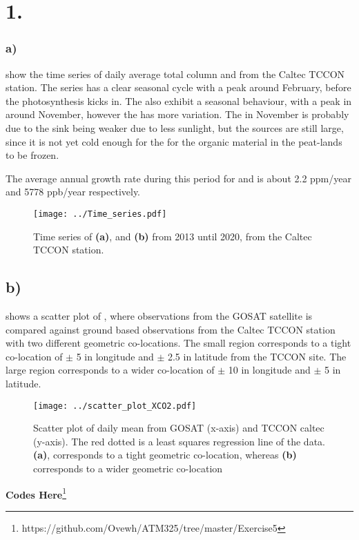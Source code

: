 \section*{1.}

\subsubsection*{a)}  show the time series of
daily average total column  and  from the Caltec TCCON station.
The  series has a 
clear seasonal cycle with a peak around February, before the photosynthesis
kicks in. The  also exhibit a
seasonal behaviour, with a peak in  around November, however the
 has more variation. The  in November is probably due to the
sink being weaker due to less sunlight, but the sources are still large, since
it is not yet cold enough for the for the organic material in the peat-lands to
be frozen. 

The average annual growth rate during this period for  and  is
about 2.2 ppm/year and 5778 ppb/year respectively.  
 
\begin{figure}[htbp]
    \texttt{[image: ../Time\_series.pdf]}
    \centering
    \caption{Time series of  \textbf{(a)}, and  \textbf{(b)} from 2013 until 2020, from the Caltec TCCON station.}
    \label{fig:Time_series_XCH4_XCO2}

\end{figure}

\subsection*{b)}
 shows a scatter plot of , where observations
from the GOSAT satellite is compared against ground based observations from
the Caltec TCCON station with two different geometric co-locations. The 
small region  corresponds to a tight co-location of $\pm$ 5 \degree in longitude
and $\pm$ 2.5 \degree in latitude from the TCCON site. The large region
corresponds to a wider co-location of $\pm$ 10 \degree in longitude and $\pm$
5 \degree in latitude. 
\begin{figure}[htbp]
    \centering
    \texttt{[image: ../scatter\_plot\_XCO2.pdf]}
    \caption{Scatter plot of daily mean  from GOSAT (x-axis) and TCCON caltec (y-axis). The red dotted is a least squares regression line of the data. \textbf{(a)}, corresponds to a tight geometric co-location, whereas \textbf{(b)} corresponds to a wider geometric co-location}
    \label{fig:scatter_XCO2}
\end{figure}

\textbf{Codes Here}\footnote{https://github.com/Ovewh/ATM325/tree/master/Exercise5}